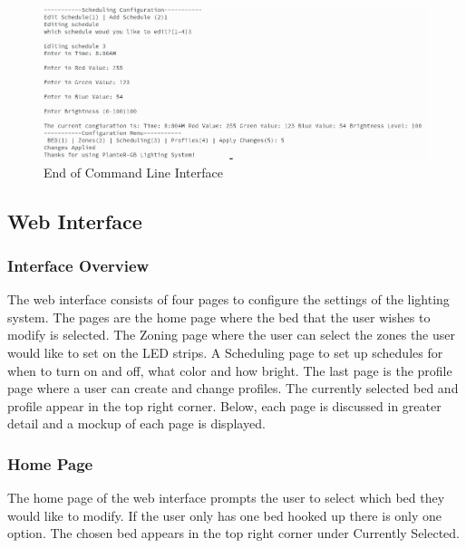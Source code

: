 \documentclass[onecolumn, draftclsnofoot,10pt, compsoc]{IEEEtran}
\begin{document}
\begin{center}
			            \begin{figure}[H]
			                \includegraphics[width=\linewidth]{comand_line_interface/Selection_005.png}
			                \caption{End of Command Line Interface}
			                \label{fig:End of Command Line Interface}
			            \end{figure}
			        \end{center}

			        \subsection{Web Interface}
			            \subsubsection{Interface Overview}
			            The web interface consists of four pages to configure the settings of
			            the lighting system. The pages are the home page where the bed that the user
			            wishes to modify is selected. The Zoning page where the user can select
			            the zones the user would like to set on the LED strips. A Scheduling page
			            to set up schedules for when to turn on and off, what color and how bright.
			            The last page is the profile page where a user can create and change profiles.
			            The currently selected bed and profile appear in the top right corner.
			            Below, each page is discussed in greater detail and a mockup of each page
			            is displayed.
			            \subsubsection{Home Page}
			            The home page of the web interface prompts the user to select which
			            bed they would like to modify. If the user only has one bed hooked up there
			            is only one option. The chosen bed appears in the top right corner under Currently
			            Selected.
\end{document}
